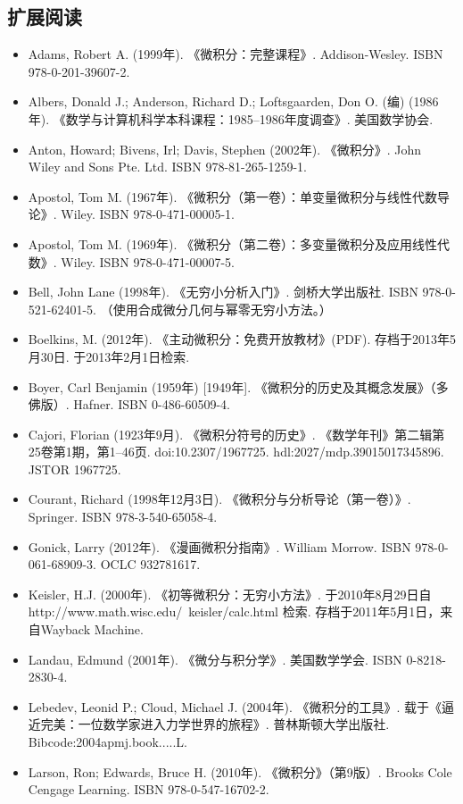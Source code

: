 \subsection{扩展阅读}
\begin{itemize}
\item Adams, Robert A. (1999年). 《微积分：完整课程》. Addison-Wesley. ISBN 978-0-201-39607-2.
\item Albers, Donald J.; Anderson, Richard D.; Loftsgaarden, Don O. (编) (1986年). 《数学与计算机科学本科课程：1985–1986年度调查》. 美国数学协会.
\item Anton, Howard; Bivens, Irl; Davis, Stephen (2002年). 《微积分》. John Wiley and Sons Pte. Ltd. ISBN 978-81-265-1259-1.
\item Apostol, Tom M. (1967年). 《微积分（第一卷）：单变量微积分与线性代数导论》. Wiley. ISBN 978-0-471-00005-1.
\item Apostol, Tom M. (1969年). 《微积分（第二卷）：多变量微积分及应用线性代数》. Wiley. ISBN 978-0-471-00007-5.
\item Bell, John Lane (1998年). 《无穷小分析入门》. 剑桥大学出版社. ISBN 978-0-521-62401-5. （使用合成微分几何与幂零无穷小方法。）
\item Boelkins, M. (2012年). 《主动微积分：免费开放教材》(PDF). 存档于2013年5月30日. 于2013年2月1日检索.
\item Boyer, Carl Benjamin (1959年) [1949年]. 《微积分的历史及其概念发展》（多佛版）. Hafner. ISBN 0-486-60509-4.
\item Cajori, Florian (1923年9月). 《微积分符号的历史》. 《数学年刊》第二辑第25卷第1期，第1–46页. doi:10.2307/1967725. hdl:2027/mdp.39015017345896. JSTOR 1967725.
\item Courant, Richard (1998年12月3日). 《微积分与分析导论（第一卷）》. Springer. ISBN 978-3-540-65058-4.
\item Gonick, Larry (2012年). 《漫画微积分指南》. William Morrow. ISBN 978-0-061-68909-3. OCLC 932781617.
\item Keisler, H.J. (2000年). 《初等微积分：无穷小方法》. 于2010年8月29日自 http://www.math.wisc.edu/~keisler/calc.html 检索. 存档于2011年5月1日，来自Wayback Machine.
\item Landau, Edmund (2001年). 《微分与积分学》. 美国数学学会. ISBN 0-8218-2830-4.
\item Lebedev, Leonid P.; Cloud, Michael J. (2004年). 《微积分的工具》. 载于《逼近完美：一位数学家进入力学世界的旅程》. 普林斯顿大学出版社. Bibcode:2004apmj.book.....L.
\item Larson, Ron; Edwards, Bruce H. (2010年). 《微积分》（第9版）. Brooks Cole Cengage Learning. ISBN 978-0-547-16702-2.

\end{itemize}
